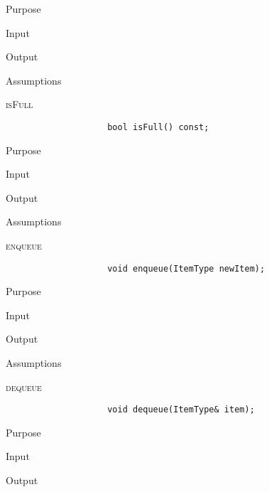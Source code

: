 \documentclass[pdftex, 12pt]{article}
\begin{document}
\begin{description}
\begin{description}
\begin{description}
\begin{description}
					\item{Purpose}

					\item{Input}

					\item{Output}

					\item{Assumptions}

				\end{description}
			\item{\textsc{isFull}}
				\begin{lstlisting}
					bool isFull() const;
				\end{lstlisting}
				\begin{description}

					\item{Purpose}

					\item{Input}

					\item{Output}

					\item{Assumptions}

				\end{description}
			\item{\textsc{enqueue}}
				\begin{lstlisting}
					void enqueue(ItemType newItem);
				\end{lstlisting}
				\begin{description}

					\item{Purpose}

					\item{Input}

					\item{Output}

					\item{Assumptions}

				\end{description}
			\item{\textsc{dequeue}}
				\begin{lstlisting}
					void dequeue(ItemType& item);
				\end{lstlisting}
				\begin{description}

					\item{Purpose}

					\item{Input}

					\item{Output}


\end{description}
\end{description}
\end{description}
\end{description}
\end{document}
